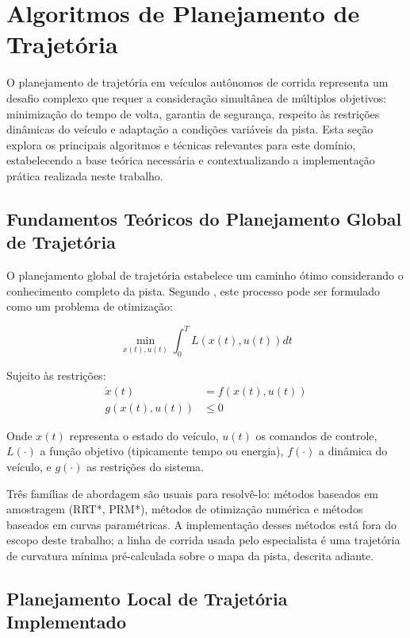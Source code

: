 \section{Algoritmos de Planejamento de Trajetória}

O planejamento de trajetória em veículos autônomos de corrida representa um
desafio complexo que requer a consideração simultânea de múltiplos objetivos:
minimização do tempo de volta, garantia de segurança, respeito às restrições
dinâmicas do veículo e adaptação a condições variáveis da pista. Esta seção
explora os principais algoritmos e técnicas relevantes para este domínio,
estabelecendo a base teórica necessária e contextualizando a implementação
prática realizada neste trabalho.

\subsection{Fundamentos Teóricos do Planejamento Global de Trajetória}

O planejamento global de trajetória estabelece um caminho ótimo considerando o
conhecimento completo da pista. Segundo \cite{Karaman2011Optimal}, este
processo pode ser formulado como um problema de otimização:

\begin{equation}
    \min_{x(t), u(t)} \int_0^T L(x(t), u(t))dt
    \label{eq:trajectory_optimization}
\end{equation}

Sujeito às restrições:
\begin{align}
    \dot{x}(t)    & = f(x(t), u(t)) \label{eq:trajectory_constraint_dynamics} \\
    g(x(t), u(t)) & \leq 0 \label{eq:trajectory_constraint_limits}
\end{align}

Onde $x(t)$ representa o estado do veículo, $u(t)$ os comandos de controle,
$L(\cdot)$ a função objetivo (tipicamente tempo ou energia), $f(\cdot)$ a
dinâmica do veículo, e $g(\cdot)$ as restrições do sistema.

Três famílias de abordagem são usuais para resolvê-lo: métodos baseados em
amostragem (RRT*, PRM*), métodos de otimização numérica e métodos baseados em
curvas paramétricas. A implementação desses métodos está fora do escopo deste
trabalho; a linha de corrida usada pelo especialista é uma trajetória de
curvatura mínima pré-calculada sobre o mapa da pista, descrita adiante.

\subsection{Planejamento Local de Trajetória Implementado}

